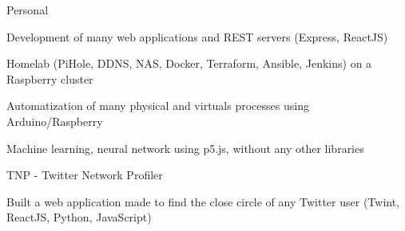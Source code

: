 
\begin{cventries}
  \cventry
    {} %
    {Personal} %
    {} %
    {} %
    {
      \begin{cvitems} %
        \item {Development of many web applications and REST servers (Express, ReactJS)}
        \item {Homelab (PiHole, DDNS, NAS, Docker, Terraform, Ansible, Jenkins) on a Raspberry cluster}
		\item {Automatization of many physical and virtuals processes using Arduino/Raspberry}
        \item {Machine learning, neural network using p5.js, without any other libraries}
      \end{cvitems}
    }

  \cventry
    {} %
    {TNP - Twitter Network Profiler} %
    {} %
    {} %
    {
      \begin{cvitems} %
      	\item {Built a web application made to find the close circle of any Twitter user (Twint, ReactJS, Python, JavaScript)}
      \end{cvitems}
    }
    
\end{cventries}
